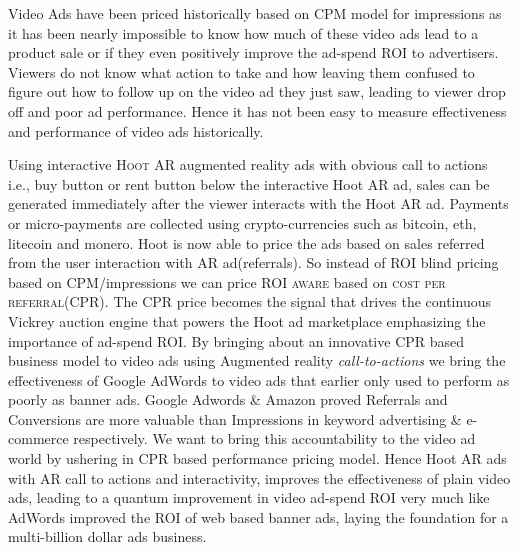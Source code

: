 Video Ads have been priced historically based on CPM model for impressions as it has been nearly impossible to know how much of these video ads lead to a product sale or if they even positively improve the ad-spend ROI to advertisers. Viewers do not know what action to take and how leaving them confused to figure out how to follow up on the video ad they just saw, leading to viewer drop off and poor ad performance. Hence it has not been easy  to measure effectiveness and performance of video ads historically.

Using interactive \textsc{Hoot AR} augmented reality  ads with obvious call to actions i.e., buy button or rent button below the interactive Hoot AR ad, sales can be generated immediately after the viewer interacts with the Hoot AR ad. Payments or micro-payments are collected using crypto-currencies such as bitcoin, eth, litecoin and monero. Hoot is now able to price the ads based on sales referred from the user interaction with AR ad(referrals). So instead of ROI blind pricing based on CPM/impressions we can price \textsc{ROI aware} based on \textsc{cost per referral(CPR)}. The CPR price becomes the signal that drives the continuous Vickrey auction engine that powers the Hoot ad marketplace emphasizing the importance of ad-spend ROI. By bringing about an innovative CPR based business model to video ads using Augmented reality \emph{call-to-actions} we bring the effectiveness of Google AdWords to video ads that earlier only used to perform as poorly as banner ads. Google Adwords \& Amazon proved Referrals and Conversions are more valuable than Impressions in keyword advertising \& e-commerce respectively. We want to bring this accountability to the video ad world by ushering in CPR based performance pricing model. Hence Hoot AR ads with AR call to actions and interactivity, improves the effectiveness of plain video ads, leading to a quantum improvement in video ad-spend ROI very much like AdWords improved the ROI of web based banner ads, laying the foundation for a multi-billion dollar ads business. 
